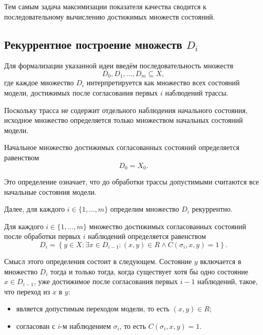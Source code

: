 Тем самым задача максимизации показателя качества сводится к последовательному
вычислению достижимых множеств состояний.

\subsection{Рекуррентное построение множеств $D_i$}

Для формализации указанной идеи введём последовательность множеств
\[
D_0, D_1, \dots, D_m \subseteq X,
\]
где каждое множество $D_i$ интерпретируется как множество всех состояний
модели, достижимых после согласования первых $i$ наблюдений трассы.

Поскольку трасса не содержит отдельного наблюдения начального состояния,
исходное множество определяется только множеством начальных состояний модели.

\begin{definition}\label{def:d0}
Начальное множество достижимых согласованных состояний определяется равенством
\begin{equation}\label{f14}
D_0 = X_0.
\end{equation}
\end{definition}

Это определение означает, что до обработки трассы допустимыми считаются все
начальные состояния модели.

Далее, для каждого $i \in \{1,\dots,m\}$ определим множество $D_i$ рекуррентно.

\begin{definition}\label{def:di}
Для каждого $i \in \{1,\dots,m\}$ множество достижимых согласованных состояний
после обработки первых $i$ наблюдений определяется равенством
\begin{equation}\label{f15}
D_i
=
\left\{
y \in X
:
\exists x \in D_{i-1} : (x,y) \in R \land C(\sigma_i,x,y)=1
\right\}.
\end{equation}
\end{definition}

Смысл этого определения состоит в следующем. Состояние $y$ включается в
множество $D_i$ тогда и только тогда, когда существует хотя бы одно состояние
$x \in D_{i-1}$, уже достижимое после согласования первых $i-1$ наблюдений,
такое, что переход из $x$ в $y$:
\begin{itemize}[leftmargin=0pt,itemindent=4.6em]
    \item является допустимым переходом модели, то есть $(x,y) \in R$;
    \item согласован с $i$-м наблюдением $\sigma_i$, то есть
    $C(\sigma_i,x,y)=1$.
\end{itemize}

